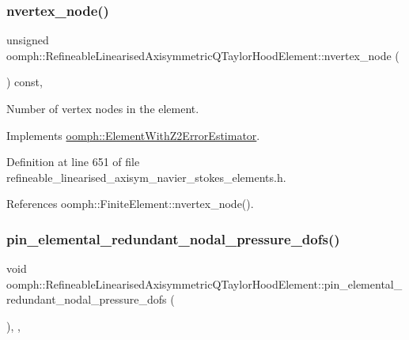 \subsubsection{\texorpdfstring{nvertex\+\_\+node()}{nvertex\_node()}}
{\footnotesize\ttfamily unsigned oomph\+::\+Refineable\+Linearised\+Axisymmetric\+Q\+Taylor\+Hood\+Element\+::nvertex\+\_\+node (\begin{DoxyParamCaption}{ }\end{DoxyParamCaption}) const\hspace{0.3cm}{\ttfamily [inline]}, {\ttfamily [virtual]}}



Number of vertex nodes in the element. 



Implements \hyperlink{classoomph_1_1ElementWithZ2ErrorEstimator_a19495a0e77ef4ff35f15fdf7913b4077}{oomph\+::\+Element\+With\+Z2\+Error\+Estimator}.



Definition at line 651 of file refineable\+\_\+linearised\+\_\+axisym\+\_\+navier\+\_\+stokes\+\_\+elements.\+h.



References oomph\+::\+Finite\+Element\+::nvertex\+\_\+node().

\mbox{\label{classoomph_1_1RefineableLinearisedAxisymmetricQTaylorHoodElement_addc0cedf610bb49e08d90bf541cab4f5}} 
\subsubsection{\texorpdfstring{pin\+\_\+elemental\+\_\+redundant\+\_\+nodal\+\_\+pressure\+\_\+dofs()}{pin\_elemental\_redundant\_nodal\_pressure\_dofs()}}
{\footnotesize\ttfamily void oomph\+::\+Refineable\+Linearised\+Axisymmetric\+Q\+Taylor\+Hood\+Element\+::pin\+\_\+elemental\+\_\+redundant\+\_\+nodal\+\_\+pressure\+\_\+dofs (\begin{DoxyParamCaption}{ }\end{DoxyParamCaption})\hspace{0.3cm}{\ttfamily [inline]}, {\ttfamily [private]}, {\ttfamily [virtual]}}



